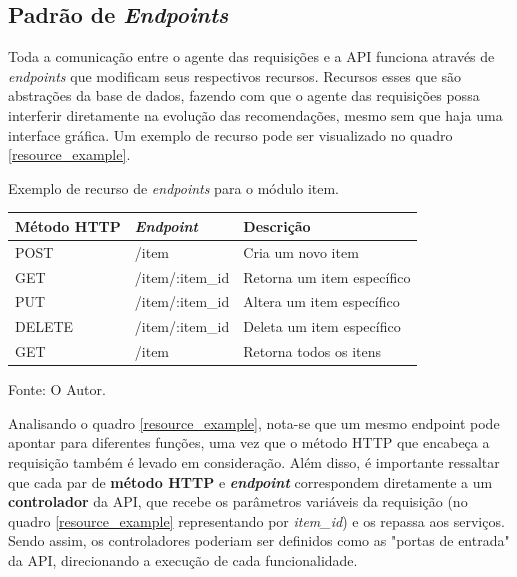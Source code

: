 \documentclass[12pt, openright, oneside, a4paper, brazil]{abntex2}
\begin{document}
\subsection{Padrão de \textit{Endpoints}} \label{endpoints}

Toda a comunicação entre o agente das requisições e a API funciona através de \textit{endpoints} que modificam seus respectivos recursos. Recursos esses que são abstrações da base de dados, fazendo com que o agente das requisições possa interferir diretamente na evolução das recomendações, mesmo sem que haja uma interface gráfica. Um exemplo de recurso pode ser visualizado no quadro \ref{resource_example}.

\begin{quadro}[h!tp]

	\caption{\label{resource_example}Exemplo de recurso de \textit{endpoints} para o módulo item.}
	\centering
	\begin{tabular}{|l|l|l|}
	\hline
	\textbf{Método HTTP} & \textit{\textbf{Endpoint}} & \textbf{Descrição}         \\ \hline
	POST                 & /item                      & Cria um novo item           \\ \hline
	GET                  & /item/:item\_id 			  & Retorna um item específico  \\ \hline
	PUT                  & /item/:item\_id            & Altera um item específico  \\ \hline
	DELETE               & /item/:item\_id            & Deleta um item específico  \\ \hline
	GET                  & /item                      & Retorna todos os itens      \\ \hline
	\end{tabular}

	Fonte: O Autor.

\end{quadro}

Analisando o quadro \ref{resource_example}, nota-se que um mesmo endpoint pode apontar para diferentes funções, uma vez que o método HTTP que encabeça a requisição também é levado em consideração. Além disso, é importante ressaltar que cada par de \textbf{método HTTP} e \textbf{\textit{endpoint}} correspondem diretamente a um \textbf{controlador} da API, que recebe os parâmetros variáveis da requisição (no quadro \ref{resource_example} representando por \textit{item\_id}) e os repassa aos serviços. Sendo assim, os controladores poderiam ser definidos como as "portas de entrada" da API, direcionando a execução de cada funcionalidade. 
\end{document}
